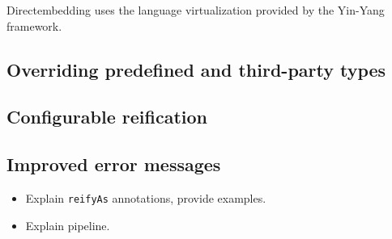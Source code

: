 Directembedding uses the language virtualization provided by the Yin-Yang~\autocite{jovanovic_yin-yang:_2014} framework.


\subsection{Overriding predefined and third-party types} %
\label{sub:Overridingpredefinedandthirdpartytypes}


\subsection{Configurable reification} %
\label{sub:Configurablereification}


\subsection{Improved error messages} %
\label{sub:Improvederrormessages}


\begin{itemize}
    \item Explain \texttt{reifyAs} annotations, provide examples.
    \item Explain pipeline.
\end{itemize}



